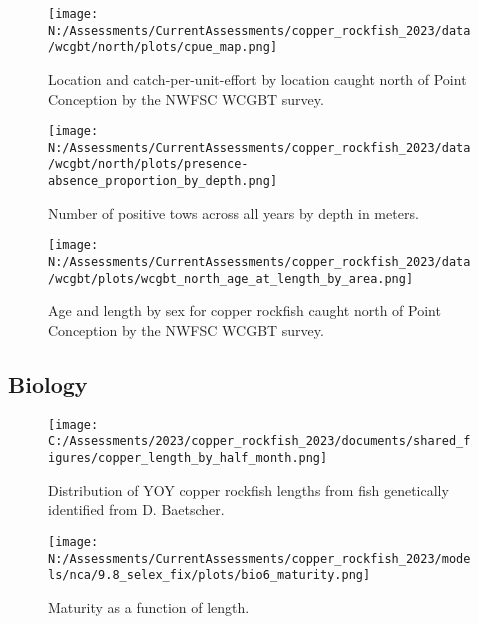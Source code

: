\documentclass[11pt,
  english,
  letterpaper,
]{article}
\begin{document}
\pagebreak

\begin{figure}
\centering
\texttt{[image: N:/Assessments/CurrentAssessments/copper\_rockfish\_2023/data/wcgbt/north/plots/cpue\_map.png]}
\caption{Location and catch-per-unit-effort by location caught north of Point Conception by the NWFSC WCGBT survey.\label{fig:wcgbt-cpue}}
\end{figure}

\pagebreak

\begin{figure}
\centering
\texttt{[image: N:/Assessments/CurrentAssessments/copper\_rockfish\_2023/data/wcgbt/north/plots/presence-absence\_proportion\_by\_depth.png]}
\caption{Number of positive tows across all years by depth in meters.\label{fig:wcgbt-depth}}
\end{figure}

\pagebreak

\begin{figure}
\centering
\texttt{[image: N:/Assessments/CurrentAssessments/copper\_rockfish\_2023/data/wcgbt/plots/wcgbt\_north\_age\_at\_length\_by\_area.png]}
\caption{Age and length by sex for copper rockfish caught north of Point Conception by the NWFSC WCGBT survey.\label{fig:wcgbt-len-age}}
\end{figure}

\pagebreak

\hypertarget{biology}{%
\subsection{Biology}\label{biology}}

\begin{figure}
\centering
\texttt{[image: C:/Assessments/2023/copper\_rockfish\_2023/documents/shared\_figures/copper\_length\_by\_half\_month.png]}
\caption{Distribution of YOY copper rockfish lengths from fish genetically identified from D. Baetscher.\label{fig:copper-smurf-length}}
\end{figure}

\pagebreak

\begin{figure}
\centering
\texttt{[image: N:/Assessments/CurrentAssessments/copper\_rockfish\_2023/models/nca/9.8\_selex\_fix/plots/bio6\_maturity.png]}
\caption{Maturity as a function of length.\label{fig:maturity}}
\end{figure}
\end{document}
